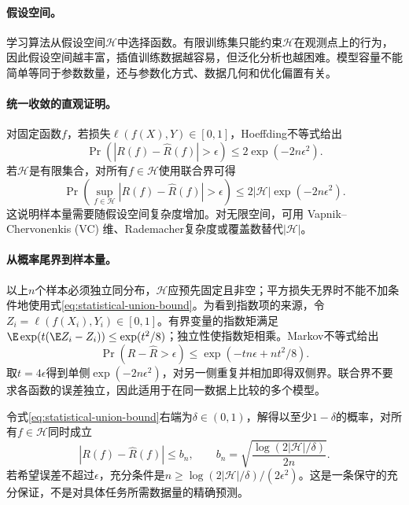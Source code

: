 \paragraph{假设空间。}
学习算法从假设空间$\mathcal{H}$中选择函数。有限训练集只能约束$\mathcal{H}$在观测点上的行为，因此假设空间越丰富，插值训练数据越容易，但泛化分析也越困难。模型容量不能简单等同于参数数量，还与参数化方式、数据几何和优化偏置有关。

\paragraph{统一收敛的直观证明。}
对固定函数$f$，若损失$\ell(f(X),Y)\in[0,1]$，Hoeffding不等式给出
\begin{equation}
 \Pr\left(|R(f)-\hat R(f)|>\epsilon\right)\leq2\exp(-2n\epsilon^2).
\end{equation}
若$\mathcal{H}$是有限集合，对所有$f\in\mathcal{H}$使用联合界可得
\begin{equation}
 \Pr\left(\sup_{f\in\mathcal{H}}|R(f)-\hat R(f)|>\epsilon\right)
 \leq2|\mathcal{H}|\exp(-2n\epsilon^2).\label{eq:statistical-union-bound}
\end{equation}
这说明样本量需要随假设空间复杂度增加。对无限空间，可用 Vapnik--Chervonenkis (VC) 维、Rademacher复杂度或覆盖数替代$|\mathcal{H}|$。

\paragraph{从概率尾界到样本量。}
以上$n$个样本必须独立同分布，$\mathcal H$应预先固定且非空；平方损失无界时不能不加条件地使用式\eqref{eq:statistical-union-bound}。为看到指数项的来源，令$Z_i=\ell(f(X_i),Y_i)\in[0,1]$。有界变量的指数矩满足$\E\exp(t(\E Z_i-Z_i))\leq\exp(t^2/8)$；独立性使指数矩相乘。Markov不等式给出
\begin{equation}
 \Pr(R-\hat R>\epsilon)
 \leq\exp(-tn\epsilon+nt^2/8).
\end{equation}
取$t=4\epsilon$得到单侧$\exp(-2n\epsilon^2)$，对另一侧重复并相加即得双侧界。联合界不要求各函数的误差独立，因此适用于在同一数据上比较的多个模型。

令式\eqref{eq:statistical-union-bound}右端为$\delta\in(0,1)$，解得以至少$1-\delta$的概率，对所有$f\in\mathcal H$同时成立
\begin{equation}
 |R(f)-\hat R(f)|\leq b_n,
 \qquad b_n=\sqrt{\frac{\log(2|\mathcal H|/\delta)}{2n}}.\label{eq:statistical-uniform-radius}
\end{equation}
若希望误差不超过$\epsilon$，充分条件是$n\geq\log(2|\mathcal H|/\delta)/(2\epsilon^2)$。这是一条保守的充分保证，不是对具体任务所需数据量的精确预测。

